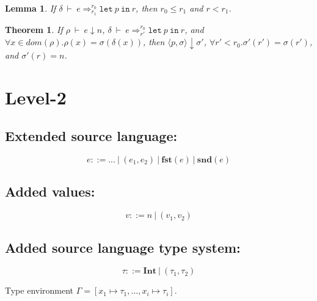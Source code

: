\documentclass[a4paper]{article}
\newtheorem{thm}[equation]{Theorem}
\newtheorem{lem}[equation]{Lemma}
\def\Fst#1{\mathbf{fst} (#1)}
\def\Snd#1{\mathbf{snd} (#1)}
\def\Int{\mathbf{Int}}
\def\Eva{\downarrow}
\def\Ra{\Rightarrow}
\def\Env{\ \vdash\ }
\def\Sgm{\sigma}
\def\Map#1#2{#1 \mapsto #2}
\def\Eval#1#2#3{#1 \Env #2 \Eva #3 }
\def\TaSem#1#2#3{\langle #1,#2 \rangle \Eva #3}
\def\Talet#1#2{\mathtt{let} \ #1 \ \mathtt{in} \ #2}
\def\Trans#1#2#3#4#5{#1 \Env #2 \Ra^{#4}_{#5} #3}
\begin{document}
\begin{lem}
	If $\Trans{\delta}{e}{\Talet{p}{r}}{r_0}{r_1}$, then $r_0 \le r_1$ and $r < r_1$.
	\label{fresh1}
\end{lem}

\begin{thm}
	If $\Eval{\rho}{e}{n}$, $\Trans{\delta}{e}{\Talet{p}{r}} {r_0} {r'}$, and $\forall x \in dom(\rho).\rho(x) = \Sgm(\delta(x))$,
	then $\TaSem{p}{\Sgm}{\Sgm'}$, $\forall r' < r_0.\Sgm'(r') = \Sgm(r') $, and $\Sgm'(r) = n$. 
\end{thm}


\section{Level-2}
\subsection{Extended source language:}
$$e ::= ... \ |\ (e_1,e_2) \ |\ \Fst{e} \ |\ \Snd{e}$$

\subsection{Added values:}

$$v ::= n \ | \ (v_1,v_2) $$

\subsection{Added source language type system:}
$$ \tau ::= \Int \ | \ (\tau_1,\tau_2) $$

Type environment $\Gamma = [\Map{x_1}{\tau_1}, ..., \Map{x_i}{\tau_i} ]$.
\end{document}
